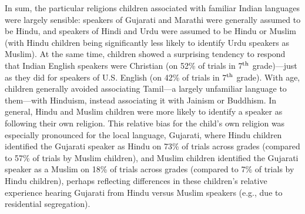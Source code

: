 \documentclass{foushee-adapted-preprint}
\begin{document}
In sum, the particular religions children associated with familiar Indian languages were largely sensible: speakers of Gujarati and Marathi were generally assumed to be Hindu, and speakers of Hindi and Urdu were assumed to be Hindu or Muslim (with Hindu children being significantly less likely to identify Urdu speakers as Muslim). At the same time, children showed a surprising tendency to respond that Indian English speakers were Christian (on 52\% of trials in 7$^{\textnormal{th}}$ grade)---just as they did for speakers of U.S. English (on 42\% of trials in 7$^{\textnormal{th}}$ grade).  
With age, children generally avoided associating Tamil---a largely unfamiliar language to them---with Hinduism, instead associating it with Jainism or Buddhism.
In general, Hindu and Muslim children were more likely to identify a speaker as following their own religion. %
This relative bias for the child's own religion was especially pronounced for the local language, Gujarati, where Hindu children identified the Gujarati speaker as Hindu on 73\% of trials across grades (compared to 57\% of trials by Muslim children), and Muslim children identified the Gujarati speaker as a Muslim on 18\% of trials across grades (compared to 7\% of trials by Hindu children), perhaps reflecting differences in these children's relative experience hearing Gujarati from Hindu versus Muslim speakers (e.g., due to residential segregation). 
\end{document}
